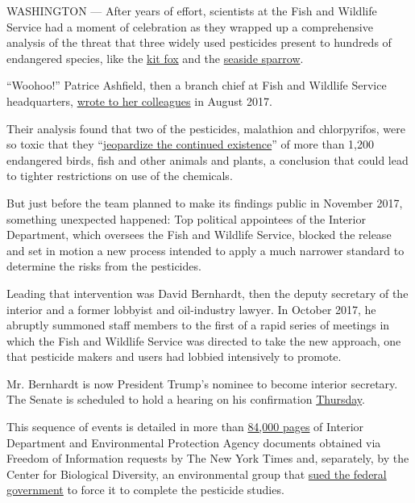 WASHINGTON --- After years of effort, scientists at the Fish and
Wildlife Service had a moment of celebration as they wrapped up a
comprehensive analysis of the threat that three widely used pesticides
present to hundreds of endangered species, like the
\href{https://www.epa.gov/sites/production/files/2013-08/documents/san-joaquin-kitfox.pdf}{kit
fox} and the
\href{https://www.nps.gov/ever/learn/nature/csss.htm}{seaside sparrow}.

``Woohoo!'' Patrice Ashfield, then a branch chief at Fish and Wildlife
Service headquarters,
\href{https://www.documentcloud.org/documents/5778894-Trump-Era-Shift-Evaluating-Pesticide-Threats-to.html\#document/p42/a488261}{wrote
to her colleagues} in August 2017.

Their analysis found that two of the pesticides, malathion and
chlorpyrifos, were so toxic that they
``\href{https://www.epa.gov/laws-regulations/summary-endangered-species-act}{jeopardize
the continued existence}'' of more than 1,200 endangered birds, fish and
other animals and plants, a conclusion that could lead to tighter
restrictions on use of the chemicals.

But just before the team planned to make its findings public in November
2017, something unexpected happened: Top political appointees of the
Interior Department, which oversees the Fish and Wildlife Service,
blocked the release and set in motion a new process intended to apply a
much narrower standard to determine the risks from the pesticides.

Leading that intervention was David Bernhardt, then the deputy secretary
of the interior and a former lobbyist and oil-industry lawyer. In
October 2017, he abruptly summoned staff members to the first of a rapid
series of meetings in which the Fish and Wildlife Service was directed
to take the new approach, one that pesticide makers and users had
lobbied intensively to promote.

Mr. Bernhardt is now President Trump's nominee to become interior
secretary. The Senate is scheduled to hold a hearing on his confirmation
\href{https://www.energy.senate.gov/public/index.cfm/hearings-and-business-meetings?ID=35F3BA18-1860-4227-8C1B-A7C5891D14E1}{Thursday}.

This sequence of events is detailed in more than
\href{https://www.documentcloud.org/documents/5778894-Trump-Era-Shift-Evaluating-Pesticide-Threats-to.html}{84,000
pages} of Interior Department and Environmental Protection Agency
documents obtained via Freedom of Information requests by The New York
Times and, separately, by the Center for Biological Diversity, an
environmental group that
\href{https://www.biologicaldiversity.org/species/amphibians/California_red-legged_frog/pdfs/RFL2-order_entering_settlement.pdf}{sued
the federal government} to force it to complete the pesticide studies.

